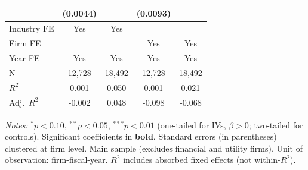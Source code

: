 \documentclass[11pt,a4paper]{article}
\begin{document}
\begin{table}[htbp]
\begin{tabular}{lcccc}
 & (0.0044) &  & (0.0093) &  \\
\midrule
Industry FE & Yes & Yes &  &  \\
Firm FE &  &  & Yes & Yes \\
Year FE & Yes & Yes & Yes & Yes \\
\midrule
N & 12,728 & 18,492 & 12,728 & 18,492 \\
$R^2$ & 0.001 & 0.050 & 0.001 & 0.021 \\
Adj.~$R^2$ & -0.002 & 0.048 & -0.098 & -0.068 \\
\bottomrule
\end{tabular}
\begin{minipage}{\linewidth}
\vspace{2pt}\scriptsize
\textit{Notes:} $^{*}p<0.10$, $^{**}p<0.05$, $^{***}p<0.01$ (one-tailed for IVs, $\beta > 0$; two-tailed for controls).
 Significant coefficients in \textbf{bold}.
 Standard errors (in parentheses) clustered at firm level.
 Main sample (excludes financial and utility firms). Unit of observation: firm-fiscal-year.
 $R^2$ includes absorbed fixed effects (not within-$R^2$).
\end{minipage}
\end{table}
\clearpage
\end{document}
